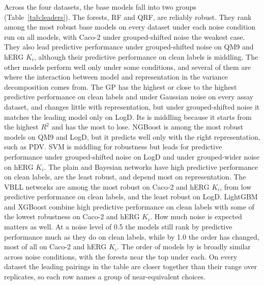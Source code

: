 Across the four datasets, the base models fall into two groups (Table~\ref{tab:leaders}). The forests, RF and QRF, are reliably robust. They rank among the most robust base models on every dataset under each noise condition run on all models, with Caco-2 under grouped-shifted noise the weakest case. They also lead predictive performance under grouped-shifted noise on QM9 and hERG $K_i$, although their predictive performance on clean labels is middling. The other models perform well only under some conditions, and several of them are where the interaction between model and representation in the variance decomposition comes from. The GP has the highest or close to the highest predictive performance on clean labels and under Gaussian noise on every assay dataset, and changes little with representation, but under grouped-shifted noise it matches the leading model only on LogD. Its \aucnorm{} is middling because it starts from the highest $R^2$ and has the most to lose. NGBoost is among the most robust models on QM9 and LogD, but it predicts well only with the right representation, such as PDV. SVM is middling for robustness but leads for predictive performance under grouped-shifted noise on LogD and under grouped-wider noise on hERG $K_i$. The plain and Bayesian networks have high predictive performance on clean labels, are the least robust, and depend most on representation. The VBLL networks are among the most robust on Caco-2 and hERG $K_i$, from low predictive performance on clean labels, and the least robust on LogD. LightGBM and XGBoost combine high predictive performance on clean labels with some of the lowest robustness on Caco-2 and hERG $K_i$. How much noise is expected matters as well. At a noise level of 0.5 the models still rank by predictive performance much as they do on clean labels, while by 1.0 the order has changed, most of all on Caco-2 and hERG $K_i$. The order of models by \aucnorm{} is broadly similar across noise conditions, with the forests near the top under each. On every dataset the leading pairings in the table are closer together than their range over replicates, so each row names a group of near-equivalent choices.

